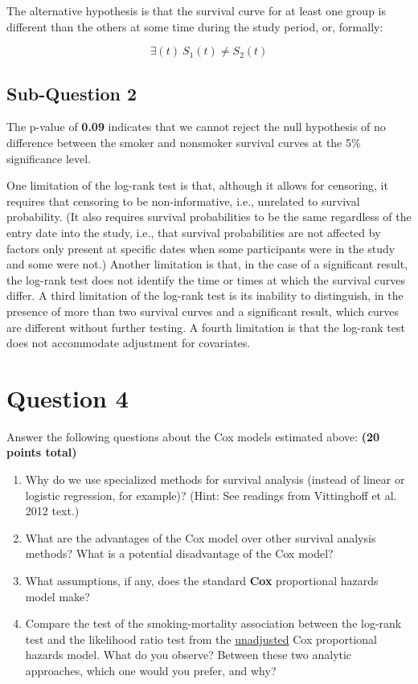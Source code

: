 \documentclass{article}\usepackage[]{graphicx}\usepackage[]{color}
\newif\ifdraft  %
\begin{document}
\vspace{2mm}

The alternative hypothesis is that the survival curve for at least one group is different than the others at some time during the study period, or, formally:

$$ \exists (t) \: S_1(t) \neq S_2(t) $$

\subsection*{Sub-Question 2}



The p-value of \textbf{0.09} indicates that we cannot reject the null hypothesis of no difference between the smoker and nonsmoker survival curves at the 5\% significance level.

\vspace{2mm}

One limitation of the log-rank test is that, although it allows for censoring, it requires that censoring to be non-informative, i.e., unrelated to survival probability.  (It also requires survival probabilities to be the same regardless of the entry date into the study, i.e., that survival probabilities are not affected by factors only present at specific dates when some participants were in the study and some were not.)  Another limitation is that, in the case of a significant result, the log-rank test does not identify the time or times at which the survival curves differ.  A third limitation of the log-rank test is its inability to distinguish, in the presence of more than two survival curves and a significant result, which curves are different without further testing.  A fourth limitation is that the log-rank test does not accommodate adjustment for covariates.

\pagebreak

\section*{Question 4}

\ifdraft

Answer the following questions about the Cox models estimated above: \textbf{(20 points total)}
  \begin{enumerate}
    \item Why do we use specialized methods for survival analysis (instead of linear or logistic regression, for example)? (Hint: See readings from Vittinghoff et al. 2012 text.)
    \item What are the advantages of the Cox model over other survival analysis methods? What is a potential disadvantage of the Cox model?
    \item What assumptions, if any, does the standard \textbf{Cox} proportional hazards model make?
    \item Compare the test of the smoking-mortality association between the log-rank test and the likelihood ratio test from the \ul{unadjusted} Cox proportional hazards model. What do you observe? Between these two analytic approaches, which one would you prefer, and why?
  \end{enumerate}
\end{document}
